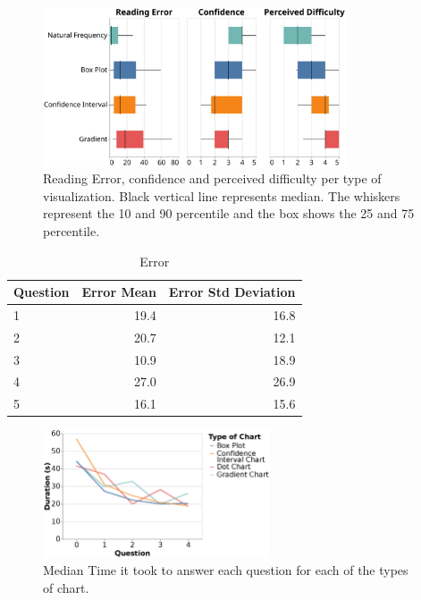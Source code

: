 \documentclass[a4paper,3p,sort&compress]{elsarticle}
\begin{document}
\begin{figure}
  \centering
  \includegraphics[width=0.8\textwidth]{comparison}
  \caption{\label{figure:errors}Reading Error, confidence and perceived difficulty per 
  type of visualization. Black vertical line represents median.
  The whiskers represent the 10 and 90 percentile and the box shows the 25 and 
  75 percentile.}
\end{figure}


\begin{table}[h!]
  \centering
  \begin{tabular}{lrr}
    \toprule
    {}Question &     Error Mean &        Error Std Deviation \\
    \midrule
    1 &  19.4 &  16.8 \\
    2 &  20.7 &  12.1 \\
    3 &  10.9 &  18.9 \\
    4 &  27.0 &  26.9 \\
    5 &  16.1 &  15.6 \\
    \bottomrule
    \end{tabular}
  \caption{Error}
  \label{table:resultsperquestion}
  \end{table}

\begin{figure}
  \centering
   \includegraphics[width=0.6\textwidth]{duration_evo2}
  \caption{\label{figure:duration} Median Time it took to answer each question for each of the types of chart.}
\end{figure}  
\end{document}
